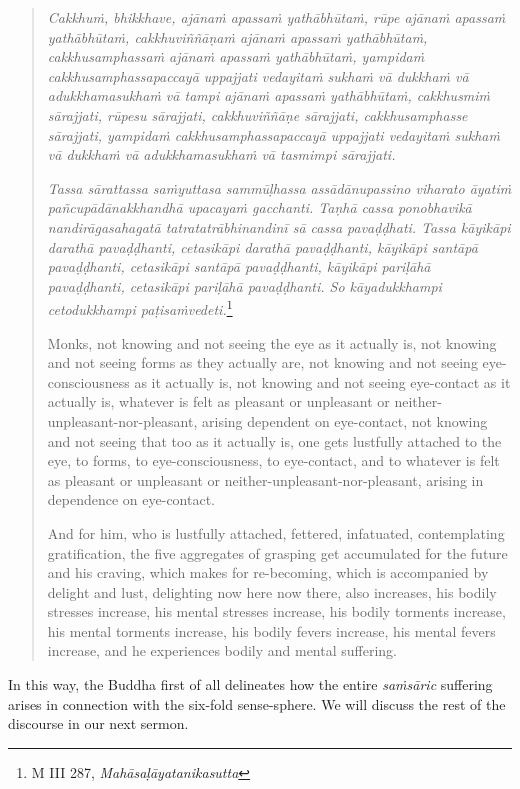 \begin{quote}
\emph{Cakkhuṁ, bhikkhave, ajānaṁ apassaṁ yathābhūtaṁ, rūpe ajānaṁ apassaṁ yathābhūtaṁ, cakkhuviññāṇaṁ ajānaṁ apassaṁ yathābhūtaṁ, cakkhusamphassaṁ ajānaṁ apassaṁ yathābhūtaṁ, yampidaṁ cakkhusamphassapaccayā uppajjati vedayitaṁ sukhaṁ vā dukkhaṁ vā adukkhamasukhaṁ vā tampi ajānaṁ apassaṁ yathābhūtaṁ, cakkhusmiṁ sārajjati, rūpesu sārajjati, cakkhuviññāṇe sārajjati, cakkhusamphasse sārajjati, yampidaṁ cakkhusamphassapaccayā uppajjati vedayitaṁ sukhaṁ vā dukkhaṁ vā adukkhamasukhaṁ vā tasmimpi sārajjati.}

\emph{Tassa sārattassa saṁyuttasa sammūḷhassa assādānupassino viharato āyatiṁ pañcupādānakkhandhā upacayaṁ gacchanti. Taṇhā cassa ponobhavikā nandirāgasahagatā tatratatrābhinandinī sā cassa pavaḍḍhati. Tassa kāyikāpi darathā pavaḍḍhanti, cetasikāpi darathā pavaḍḍhanti, kāyikāpi santāpā pavaḍḍhanti, cetasikāpi santāpā pavaḍḍhanti, kāyikāpi pariḷāhā pavaḍḍhanti, cetasikāpi pariḷāhā pavaḍḍhanti. So kāyadukkhampi cetodukkhampi paṭisaṁvedeti.}\footnote{M III 287, \emph{Mahāsaḷāyatanikasutta}}

Monks, not knowing and not seeing the eye as it actually is, not knowing and not seeing forms as they actually are, not knowing and not seeing eye-consciousness as it actually is, not knowing and not seeing eye-contact as it actually is, whatever is felt as pleasant or unpleasant or neither-unpleasant-nor-pleasant, arising dependent on eye-contact, not knowing and not seeing that too as it actually is, one gets lustfully attached to the eye, to forms, to eye-consciousness, to eye-contact, and to whatever is felt as pleasant or unpleasant or neither-unpleasant-nor-pleasant, arising in dependence on eye-contact.

And for him, who is lustfully attached, fettered, infatuated, contemplating gratification, the five aggregates of grasping get accumulated for the future and his craving, which makes for re-becoming, which is accompanied by delight and lust, delighting now here now there, also increases, his bodily stresses increase, his mental stresses increase, his bodily torments increase, his mental torments increase, his bodily fevers increase, his mental fevers increase, and he experiences bodily and mental suffering.
\end{quote}

In this way, the Buddha first of all delineates how the entire \emph{saṁsāric} suffering arises in connection with the six-fold sense-sphere. We will discuss the rest of the discourse in our next sermon.
